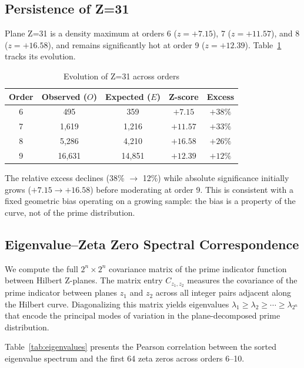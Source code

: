 \documentclass[11pt,a4paper]{article}
\begin{document}
\subsection{Persistence of Z=31}

Plane Z=31 is a density maximum at orders 6 ($z=+7.15$), 7 ($z=+11.57$),
and 8 ($z=+16.58$), and remains significantly hot at order 9 ($z=+12.39$).
Table~\ref{tab:z31} tracks its evolution.

\begin{table}[h]
\centering
\caption{Evolution of Z=31 across orders}
\label{tab:z31}
\begin{tabular}{ccccc}
\toprule
Order & Observed ($O$) & Expected ($E$) & Z-score & Excess \\
\midrule
6 & 495     & 359     & $+7.15$  & $+38\%$ \\
7 & 1,619   & 1,216   & $+11.57$ & $+33\%$ \\
8 & 5,286   & 4,210   & $+16.58$ & $+26\%$ \\
9 & 16,631  & 14,851  & $+12.39$ & $+12\%$ \\
\bottomrule
\end{tabular}
\end{table}

The relative excess declines (38\% $\to$ 12\%) while absolute significance
initially grows ($+7.15 \to +16.58$) before moderating at order 9.
This is consistent with a fixed geometric bias operating on a growing
sample: the bias is a property of the curve, not of the prime distribution.


\subsection{Eigenvalue--Zeta Zero Spectral Correspondence}

We compute the full $2^n \times 2^n$ covariance matrix of the prime
indicator function between Hilbert Z-planes.  The matrix entry
$C_{z_1,z_2}$ measures the covariance of the prime indicator between
planes $z_1$ and $z_2$ across all integer pairs adjacent along the
Hilbert curve.  Diagonalizing this matrix yields eigenvalues
$\lambda_1 \geq \lambda_2 \geq \cdots \geq \lambda_{2^n}$ that encode
the principal modes of variation in the plane-decomposed prime
distribution.

Table~\ref{tab:eigenvalues} presents the Pearson correlation between
the sorted eigenvalue spectrum and the first 64 zeta zeros across
orders 6--10.
\end{document}

